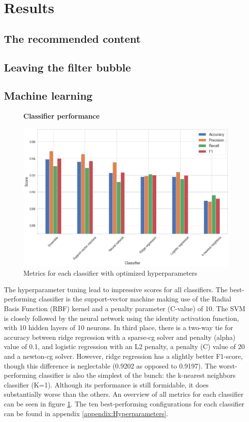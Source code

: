 \documentclass[../main.tex]{subfiles}
\begin{document}
\section{Results}

\subsection{The recommended content}

\subsection{Leaving the filter bubble}

\subsection{Machine learning}

\begin{figure}[t!]
  \textbf{Classifier performance}\par\medskip
  \centering
  \includegraphics[keepaspectratio, width=\textwidth]{images/classifier_results.png}
  \caption{Metrics for each classifier with optimized hyperparameters}
  \label{fig:ML_scores}
\end{figure}

The hyperparameter tuning lead to impressive scores for all classifiers. The best-performing classifier
is the support-vector machine making use of the Radial Basis Function (RBF) kernel and a penalty
parameter (C-value) of 10. The SVM is closely followed by the neural network using the identity
activation function, with 10 hidden layers of 10 neurons. In third place, there is a two-way tie for
accuracy between ridge regression with a sparse-cg solver and penalty (alpha) value of 0.1, and logistic
regression with an L2 penalty, a penalty (C) value of 20 and a newton-cg solver. However, ridge
regression has a slightly better F1-score, though this difference is neglectable (0.9202 as opposed to
0.9197). The worst-performing classifier is also the simplest of the bunch: the k-nearest neighbors
classifier (K=1). Although its performance is still formidable, it does substantially worse than the
others. An overview of all metrics for each classifier can be seen in figure \ref{fig:ML_scores}. The
ten best-performing configurations for each classifier can be found in appendix
\ref{appendix:Hyperparameters}.
\end{document}
